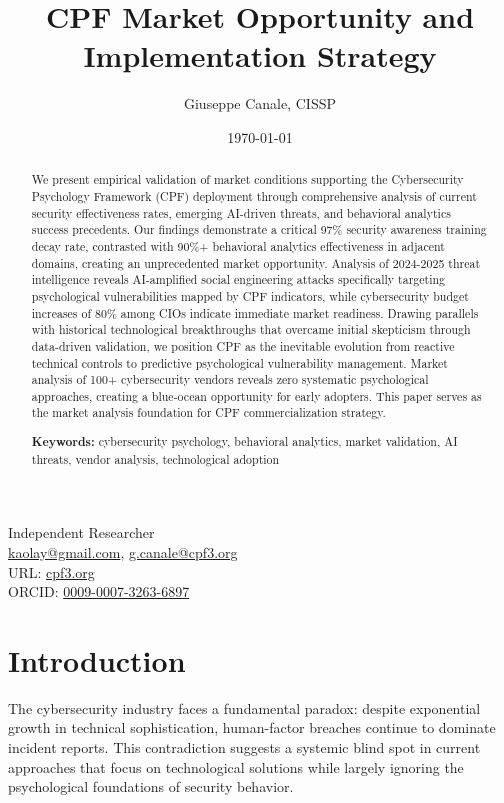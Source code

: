 \documentclass[11pt,a4paper]{article}
\title{CPF Market Opportunity and Implementation Strategy}
\author{Giuseppe Canale, CISSP}
\date{\today}
\begin{document}
\maketitle

\begin{center}
Independent Researcher\\
\href{mailto:kaolay@gmail.com}{kaolay@gmail.com}, 
\href{mailto:g.canale@cpf3.org}{g.canale@cpf3.org}\\
URL: \href{https://cpf3.org}{cpf3.org}\\
ORCID: \href{https://orcid.org/0009-0007-3263-6897}{0009-0007-3263-6897}
\end{center}

\begin{abstract}
We present empirical validation of market conditions supporting the Cybersecurity Psychology Framework (CPF) deployment through comprehensive analysis of current security effectiveness rates, emerging AI-driven threats, and behavioral analytics success precedents. Our findings demonstrate a critical 97\% security awareness training decay rate, contrasted with 90\%+ behavioral analytics effectiveness in adjacent domains, creating an unprecedented market opportunity. Analysis of 2024-2025 threat intelligence reveals AI-amplified social engineering attacks specifically targeting psychological vulnerabilities mapped by CPF indicators, while cybersecurity budget increases of 80\% among CIOs indicate immediate market readiness. Drawing parallels with historical technological breakthroughs that overcame initial skepticism through data-driven validation, we position CPF as the inevitable evolution from reactive technical controls to predictive psychological vulnerability management. Market analysis of 100+ cybersecurity vendors reveals zero systematic psychological approaches, creating a blue-ocean opportunity for early adopters. This paper serves as the market analysis foundation for CPF commercialization strategy.

\textbf{Keywords:} cybersecurity psychology, behavioral analytics, market validation, AI threats, vendor analysis, technological adoption
\end{abstract}

\section{Introduction}

The cybersecurity industry faces a fundamental paradox: despite exponential growth in technical sophistication, human-factor breaches continue to dominate incident reports. This contradiction suggests a systemic blind spot in current approaches that focus on technological solutions while largely ignoring the psychological foundations of security behavior.
\end{document}

